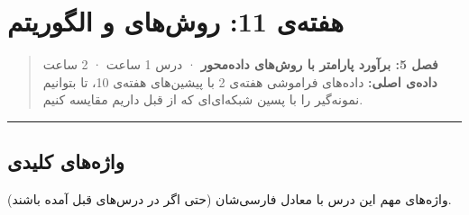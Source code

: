 \section{\texorpdfstring{هفته‌ی 11: روش‌های  و الگوریتم
}{هفته‌ی 11: روش‌های Monte Carlo و الگوریتم Metropolis\lr{--}Hastings}}

\begin{quote}
\textbf{فصل 5: برآورد پارامتر با روش‌های داده‌محور } · درس 1
ساعت ·  2 ساعت \textbf{داده‌ی اصلی:} داده‌های فراموشی هفته‌ی 2 با
پیشین‌های هفته‌ی 10، تا بتوانیم نمونه‌گیر را با پسین شبکه‌ای‌ای که از قبل
داریم مقایسه کنیم.
\end{quote}

\begin{center}\rule{0.5\linewidth}{0.5pt}\end{center}

\subsection{واژه‌های کلیدی}

واژه‌های مهم این درس با معادل فارسی‌شان (حتی اگر در درس‌های قبل آمده
باشند).

